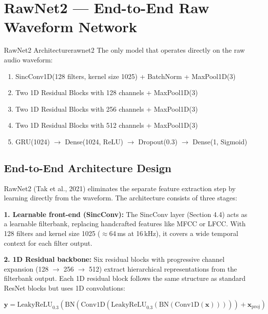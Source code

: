 \documentclass[12pt]{report}
\begin{document}
\section{RawNet2 --- End-to-End Raw Waveform Network}

\begin{tecbox}{RawNet2 Architecture}{rawnet2}
    The only model that operates directly on the raw audio waveform:
    \begin{enumerate}[noitemsep]
        \item SincConv1D(128 filters, kernel size 1025) + BatchNorm + MaxPool1D(3)
        \item Two 1D Residual Blocks with 128 channels + MaxPool1D(3)
        \item Two 1D Residual Blocks with 256 channels + MaxPool1D(3)
        \item Two 1D Residual Blocks with 512 channels + MaxPool1D(3)
        \item GRU(1024) $\to$ Dense(1024, ReLU) $\to$ Dropout(0.3) $\to$ Dense(1, Sigmoid)
    \end{enumerate}
\end{tecbox}

\subsection{End-to-End Architecture Design}

RawNet2 (Tak et al., 2021) eliminates the separate feature extraction step by learning
directly from the waveform. The architecture consists of three stages:

\textbf{1. Learnable front-end (SincConv):}
The SincConv layer (Section 4.4) acts as a learnable filterbank, replacing handcrafted features
like MFCC or LFCC. With 128 filters and kernel size 1025 ($\approx$64\,ms at 16\,kHz), it
covers a wide temporal context for each filter output.

\textbf{2. 1D Residual backbone:}
Six residual blocks with progressive channel expansion (128 $\to$ 256 $\to$ 512) extract
hierarchical representations from the filterbank output. Each 1D residual block follows the
same structure as standard ResNet blocks but uses 1D convolutions:

\begin{equation}
    \bm{y} = \text{LeakyReLU}_{0.3}\!\left(\text{BN}(\text{Conv1D}(\text{LeakyReLU}_{0.3}(\text{BN}(\text{Conv1D}(\bm{x}))))) + \bm{x}_\text{proj}\right)
\end{equation}
\end{document}
